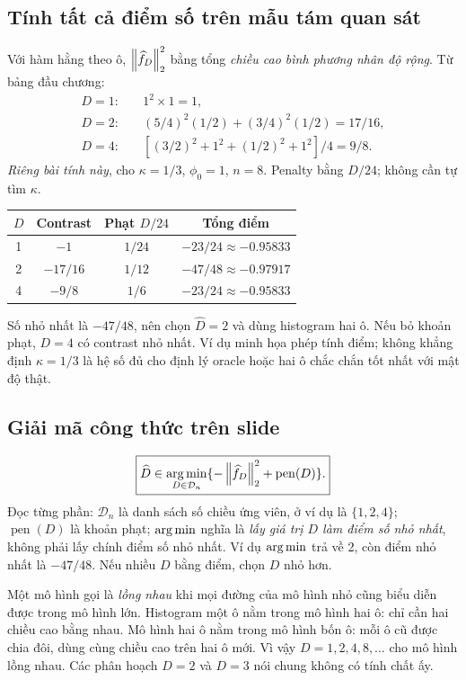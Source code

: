 \subsection{Tính tất cả điểm số trên mẫu tám quan sát}
Với hàm hằng theo ô, $\left\lVert \widehat f_D\right\rVert_2^2$ bằng tổng
\emph{chiều cao bình phương nhân độ rộng}. Từ bảng đầu chương:
\begin{align*}
D=1:\quad&1^2\times1=1,\\
D=2:\quad&(5/4)^2(1/2)+(3/4)^2(1/2)=17/16,\\
D=4:\quad&[(3/2)^2+1^2+(1/2)^2+1^2]/4=9/8.
\end{align*}
\emph{Riêng bài tính này}, cho $\kappa=1/3$, $\phi_0=1$, $n=8$.
Penalty bằng $D/24$; không cần tự tìm $\kappa$.
\begin{center}
\begin{tabular}{cccc}
\toprule $D$ & Contrast & Phạt $D/24$ & Tổng điểm\\\midrule
1 & $-1$ & $1/24$ & $-23/24\approx-0.95833$\\
2 & $-17/16$ & $1/12$ & $-47/48\approx-0.97917$\\
4 & $-9/8$ & $1/6$ & $-23/24\approx-0.95833$\\\bottomrule
\end{tabular}
\end{center}
Số nhỏ nhất là $-47/48$, nên chọn $\boxed{\widehat D=2}$ và dùng
histogram hai ô. Nếu bỏ khoản phạt, $D=4$ có contrast nhỏ nhất.
Ví dụ minh họa phép tính điểm; không khẳng định $\kappa=1/3$ là hệ số
đủ cho định lý oracle hoặc hai ô chắc chắn tốt nhất với mật độ thật.

\subsection{Giải mã công thức trên slide}
\[
\boxed{\widehat D\in\operatorname*{arg\,min}_{D\in\mathcal D_n}
\{-\left\lVert \widehat f_D\right\rVert_2^2+\operatorname{pen}(D)\}.}
\]
Đọc từng phần: $\mathcal D_n$ là danh sách số chiều ứng viên, ở ví dụ là
$\{1,2,4\}$; $\operatorname{pen}(D)$ là khoản phạt;
$\operatorname*{arg\,min}$ nghĩa là \emph{lấy giá trị $D$ làm điểm số nhỏ nhất}, không
phải lấy chính điểm số nhỏ nhất. Ví dụ $\operatorname*{arg\,min}$ trả về 2, còn điểm nhỏ
nhất là $-47/48$. Nếu nhiều $D$ bằng điểm, chọn $D$ nhỏ hơn.

Một mô hình gọi là \emph{lồng nhau} khi mọi đường của mô hình nhỏ cũng
biểu diễn được trong mô hình lớn. Histogram một ô nằm trong mô hình hai
ô: chỉ cần hai chiều cao bằng nhau. Mô hình hai ô nằm trong mô hình bốn
ô: mỗi ô cũ được chia đôi, dùng cùng chiều cao trên hai ô mới.
Vì vậy $D=1,2,4,8,\ldots$ cho mô hình lồng nhau. Các phân hoạch
$D=2$ và $D=3$ nói chung không có tính chất ấy.

